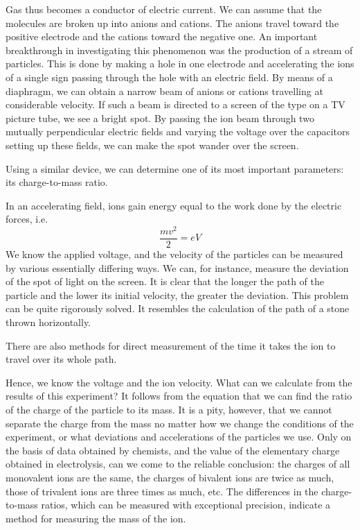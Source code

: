 Gas thus becomes a conductor of electric current. We can assume that the molecules are broken up into anions and cations. The anions travel toward the positive electrode and the cations toward the negative one. An important breakthrough in investigating this phenomenon was the production of a stream of particles. This is done by making a hole in one electrode and accelerating the ions of a single sign passing through the hole with an electric field. By means of a diaphragm, we can obtain a narrow beam of anions or cations travelling at considerable velocity. If such a beam is directed to a screen of the type on a TV picture tube, we see a bright spot. By passing the ion beam through two mutually perpendicular electric fields and varying the voltage over the capacitors setting up these fields, we can make the spot wander over the screen.

Using a similar device, we can determine one of its most important parameters: its charge-to-mass ratio.

In an accelerating field, ions gain energy equal to the work done by the electric forces, i.e.
\begin{equation*}%
\frac{mv^{2}}{2} =eV
\end{equation*}
We know the applied voltage, and the velocity of the particles can be measured by various essentially differing ways. We can, for instance, measure the deviation of the spot of light on the screen. It is clear that the longer the path of the particle and the lower its initial velocity, the greater the deviation. This problem can be quite rigorously solved. It resembles the calculation of the path of a stone thrown horizontally.

There are also methods for direct measurement of the time it takes the ion to travel over its whole path.

Hence, we know the voltage and the ion velocity. What can we calculate from the results of this experiment? It follows from the equation that we can find the ratio of the charge of the particle to its mass. It is a pity, however, that we cannot separate the charge from the mass no matter how we change the conditions of the experiment, or what deviations and accelerations of the particles we use. Only on the basis of data obtained by chemists, and the value of the elementary charge obtained in electrolysis, can we come to the reliable conclusion: the charges of all monovalent ions are the same, the charges of bivalent ions are twice as much, those of trivalent ions are three times as much, etc. The differences in the charge-to-mass ratios, which can be measured with exceptional precision, indicate a method for measuring the mass of the ion.

